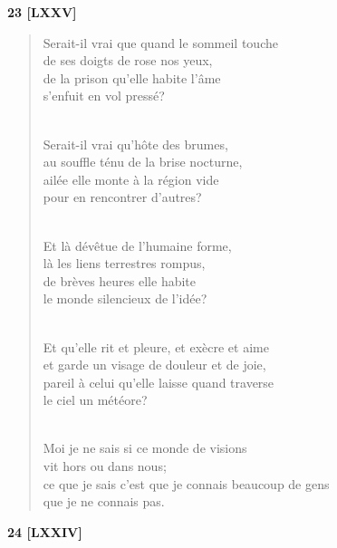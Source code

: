 \documentclass[a4paper,12pt]{book}
\begin{document}
\bigskip

\begin{center} {\bf 23 [LXXV]} \end{center}

\begin{verse}
Serait-il vrai que quand le sommeil touche \\
de ses doigts de rose nos yeux, \\
de la prison qu'elle habite l'âme \\
s'enfuit en vol pressé? \\ \

Serait-il vrai qu'hôte des brumes, \\
au souffle ténu de la brise nocturne, \\
ailée elle monte à la région vide \\
pour en rencontrer d'autres? \\ \


Et là dévêtue de l'humaine forme, \\
là les liens terrestres rompus, \\
de brèves heures elle habite \\
le monde silencieux de l'idée? \\ \

Et qu'elle rit et pleure, et exècre et aime \\
et garde un visage de douleur et de joie, \\
pareil à celui qu'elle laisse quand traverse \\
le ciel un météore? \\ \

Moi je ne sais si ce monde de visions \\
vit hors ou dans nous; \\
ce que je sais c'est que je connais beaucoup de gens \\
que je ne connais pas. \\
\end{verse}

\bigskip

\begin{center} {\bf 24 [LXXIV]} \end{center}
\end{document}
